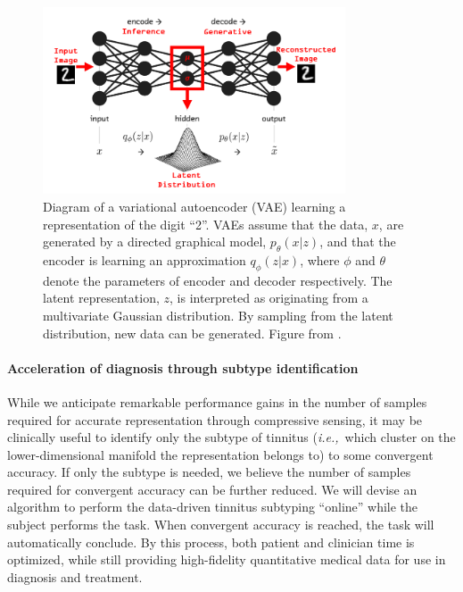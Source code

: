 \documentclass[11pt, notitlepage]{article} %
\def\ie{{\emph{i.e.,}}~}
\begin{document}
\begin{figure}[h] %
	\centering
	\includegraphics[width=0.8\textwidth]{Figures/variational-autoencoder.png}
	\caption{Diagram of a variational autoencoder (VAE) learning a representation of the digit ``2''.
	VAEs assume that the data, $x$, are generated by a directed graphical model, $p_\theta(x|z)$,
	and that the encoder is learning an approximation $q_\phi(z|x)$, where $\phi$ and $\theta$
	denote the parameters of encoder and decoder respectively.
	The latent representation, $z$, is interpreted as originating from a multivariate Gaussian distribution.
	By sampling from the latent distribution, new data can be generated. Figure from \cite{IntroductionAutoencoders2020}.}
	\label{fig:vae}
\end{figure}

\paragraph{Acceleration of diagnosis through subtype identification}

While we anticipate remarkable performance gains in the number of samples required for accurate representation
through compressive sensing,
it may be clinically useful to identify only the subtype of tinnitus
(\ie which cluster on the lower-dimensional manifold the representation belongs to)
to some convergent accuracy.
If only the subtype is needed,
we believe the number of samples required for convergent accuracy can be further reduced.
We will devise an algorithm to perform the data-driven tinnitus subtyping ``online''
while the subject performs the task.
When convergent accuracy is reached, the task will automatically conclude.
By this process, both patient and clinician time is optimized, while still providing high-fidelity quantitative medical data
for use in diagnosis and treatment.
\end{document}
